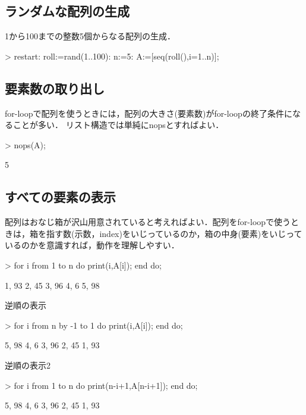 \subsection{ランダムな配列の生成}
1から100までの整数5個からなる配列の生成．
\begin{MapleInput}
> restart: 
  roll:=rand(1..100): 
  n:=5: 
  A:=[seq(roll(),i=1..n)];
\end{MapleInput}
\begin{MapleError}
                             [93, 45, 96, 6, 98]
\end{MapleError}

\subsection{要素数の取り出し}
for-loopで配列を使うときには，配列の大きさ(要素数)がfor-loopの終了条件になることが多い．
リスト構造では単純にnopsとすればよい．
\begin{MapleInput}
> nops(A);
\end{MapleInput}
\begin{MapleError}
                                      5
\end{MapleError}

\subsection{すべての要素の表示}
配列はおなじ箱が沢山用意されていると考えればよい．配列をfor-loopで使うときは，箱を指す数(示数，index)をいじっているのか，箱の中身(要素)をいじっているのかを意識すれば，動作を理解しやすい．
\begin{MapleInput}
> for i from 1 to n do 
    print(i,A[i]); 
  end do;
\end{MapleInput}
\begin{MapleError}
                                    1, 93
                                    2, 45
                                    3, 96
                                     4, 6
                                    5, 98
\end{MapleError}
逆順の表示
\begin{MapleInput}
> for i from n by -1 to 1 do
    print(i,A[i]); 
  end do;
\end{MapleInput}
\begin{MapleError}
                                    5, 98
                                     4, 6
                                    3, 96
                                    2, 45
                                    1, 93
\end{MapleError}
逆順の表示2
\begin{MapleInput}
> for i from 1 to n do
    print(n-i+1,A[n-i+1]); 
  end do;
\end{MapleInput}
\begin{MapleError}
                                    5, 98
                                     4, 6
                                    3, 96
                                    2, 45
                                    1, 93
\end{MapleError}
